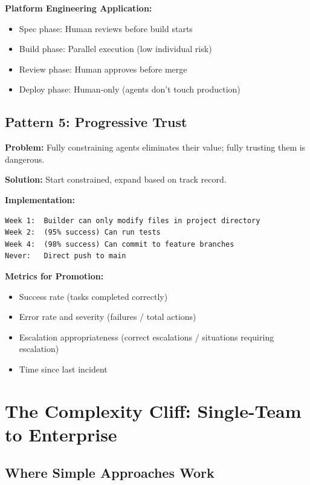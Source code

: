 \textbf{Platform Engineering Application:}
\begin{itemize}
    \item Spec phase: Human reviews before build starts
    \item Build phase: Parallel execution (low individual risk)
    \item Review phase: Human approves before merge
    \item Deploy phase: Human-only (agents don't touch production)
\end{itemize}

\subsection{Pattern 5: Progressive Trust}
\label{subsec:progressive-trust}

\textbf{Problem:} Fully constraining agents eliminates their value; fully trusting them is dangerous.

\textbf{Solution:} Start constrained, expand based on track record.

\textbf{Implementation:}
\begin{lstlisting}[caption={Progressive Trust Timeline}]
Week 1:  Builder can only modify files in project directory
Week 2:  (95% success) Can run tests
Week 4:  (98% success) Can commit to feature branches
Never:   Direct push to main
\end{lstlisting}

\textbf{Metrics for Promotion:}
\begin{itemize}
    \item Success rate (tasks completed correctly)
    \item Error rate and severity (failures / total actions)
    \item Escalation appropriateness (correct escalations / situations requiring escalation)
    \item Time since last incident
\end{itemize}

\section{The Complexity Cliff: Single-Team to Enterprise}
\label{sec:complexity-cliff}

\subsection{Where Simple Approaches Work}
\label{subsec:simple-approaches}

